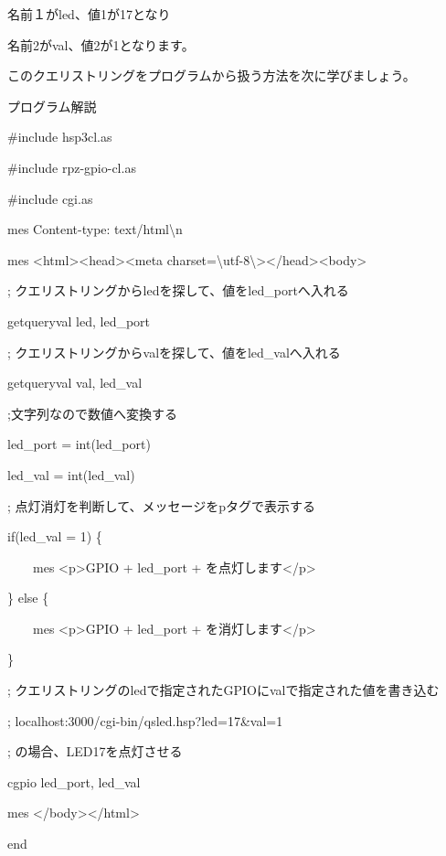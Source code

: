 \documentclass[a4paper,12pt,dvipdfmx]{jarticle}
\begin{document}
名前１がled、値1が17となり

名前2がval、値2が1となります。

このクエリストリングをプログラムから扱う方法を次に学びましょう。

\clearpage
プログラム解説



\centering
\begin{boxedminipage}{16.538cm}
\#include {\textquotedbl}hsp3cl.as{\textquotedbl}

\#include {\textquotedbl}rpz-gpio-cl.as{\textquotedbl}

\#include {\textquotedbl}cgi.as{\textquotedbl}

mes {\textquotedbl}Content-type: text/html{\textbackslash}n{\textquotedbl}

mes {\textquotedbl}{\textless}html{\textgreater}{\textless}head{\textgreater}{\textless}meta
charset={\textbackslash}{\textquotedbl}utf-8{\textbackslash}{\textquotedbl}{\textgreater}{\textless}/head{\textgreater}{\textless}body{\textgreater}{\textquotedbl}


\bigskip

;
クエリストリングからledを探して、値をled\_portへ入れる

getqueryval {\textquotedbl}led{\textquotedbl}, led\_port

;
クエリストリングからvalを探して、値をled\_valへ入れる

getqueryval {\textquotedbl}val{\textquotedbl}, led\_val

;文字列なので数値へ変換する

led\_port = int(led\_port)

led\_val = int(led\_val)


\bigskip

;
点灯消灯を判断して、メッセージをpタグで表示する

if(led\_val = 1) \{

\ \ \ \ mes {\textquotedbl}{\textless}p{\textgreater}GPIO{\textquotedbl} + led\_port +
{\textquotedbl}を点灯します{\textless}/p{\textgreater}{\textquotedbl}

\} else \{

\ \ \ \ mes {\textquotedbl}{\textless}p{\textgreater}GPIO{\textquotedbl} + led\_port +
{\textquotedbl}を消灯します{\textless}/p{\textgreater}{\textquotedbl}

\}


\bigskip

;
クエリストリングのledで指定されたGPIOにvalで指定された値を書き込む

; localhost:3000/cgi-bin/qsled.hsp?led=17\&val=1

; の場合、LED17を点灯させる

cgpio led\_port, led\_val

mes {\textquotedbl}{\textless}/body{\textgreater}{\textless}/html{\textgreater}{\textquotedbl}

end
\end{boxedminipage}
\flushleft
\end{document}
